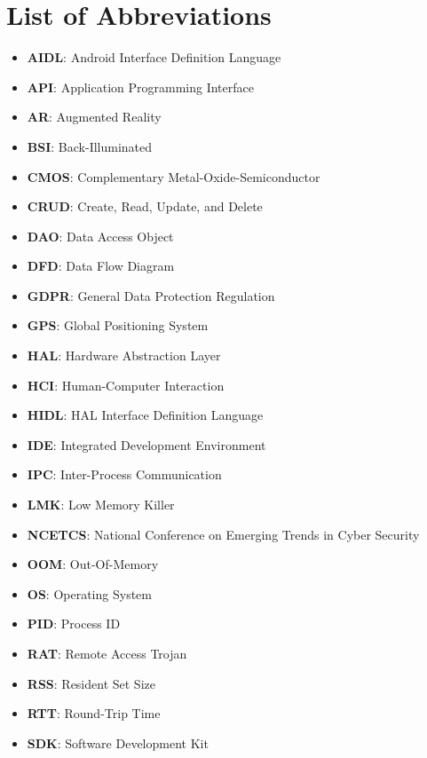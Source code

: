 \documentclass[12pt,a4paper]{report}
\begin{document}
    \chapter*{List of Abbreviations}
    \thispagestyle{empty}
    \begin{itemize}
        \item \textbf{AIDL}: Android Interface Definition Language
        \item \textbf{API}: Application Programming Interface
        \item \textbf{AR}: Augmented Reality
        \item \textbf{BSI}: Back-Illuminated
        \item \textbf{CMOS}: Complementary Metal-Oxide-Semiconductor 
        \item \textbf{CRUD}: Create, Read, Update, and Delete
        \item \textbf{DAO}: Data Access Object
        \item \textbf{DFD}: Data Flow Diagram
        \item \textbf{GDPR}: General Data Protection Regulation
        \item \textbf{GPS}: Global Positioning System
        \item \textbf{HAL}: Hardware Abstraction Layer
        \item \textbf{HCI}: Human-Computer Interaction
        \item \textbf{HIDL}: HAL Interface Definition Language
        \item \textbf{IDE}: Integrated Development Environment
        \item \textbf{IPC}: Inter-Process Communication
        \item \textbf{LMK}: Low Memory Killer
        \item \textbf{NCETCS}: National Conference on Emerging Trends in Cyber Security
        \item \textbf{OOM}: Out-Of-Memory
        \item \textbf{OS}: Operating System
        \item \textbf{PID}: Process ID
        \item \textbf{RAT}: Remote Access Trojan
        \item \textbf{RSS}: Resident Set Size
        \item \textbf{RTT}: Round-Trip Time
        \item \textbf{SDK}: Software Development Kit

\end{itemize}
\end{document}

